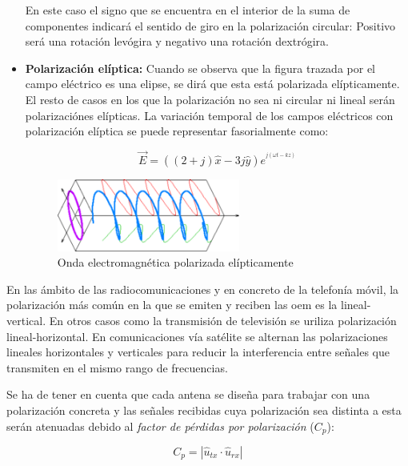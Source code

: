 \begin{itemize}
En este caso el signo que se encuentra en el interior de la suma de componentes indicará el sentido de giro en la polarización circular: Positivo será una rotación levógira y negativo una rotación dextrógira.

\item\textbf{Polarización elíptica: }Cuando se observa que la figura trazada por el campo eléctrico es una elipse, se dirá que esta está polarizada elípticamente. El resto de casos en los que la polarización no sea ni circular ni lineal serán polarizaciónes elípticas. La variación temporal de los campos eléctricos con polarización elíptica se puede representar fasorialmente como:

\begin{equation}
	\vec{E} = ((2+j)\hat{x}-3j\hat{y})e^{^{j(\omega t-kz)}}
	\label{eq:polelip}
\end{equation}
\begin{figure}[H]
    \centering
        \includegraphics[width=6cm]{archivos/polarizacion/eliptica}
        \caption{Onda electromagnética polarizada elípticamente}
        \label{fig:poleli}
\end{figure}

\end{itemize}

\par En las ámbito de las radiocomunicaciones y en concreto de la telefonía móvil, la polarización más común en la que se emiten y reciben las \gls{oem} es la lineal-vertical. En otros casos como la transmisión de televisión se uriliza polarización lineal-horizontal. En comunicaciones vía satélite se alternan las polarizaciones lineales horizontales y verticales para reducir la interferencia entre señales que transmiten en el mismo rango de frecuencias.
\\
\par Se ha de tener en cuenta que cada antena se diseña para trabajar con una polarización concreta y las señales recibidas cuya polarización sea distinta a esta serán atenuadas debido al \textit{factor de pérdidas por polarización} ($C_{p}$):

\begin{equation}
	C_{p}=\left | \hat{u}_{tx}\cdot \hat{u}_{rx} \right |
	\label{eq:polarizationlossfactor}
\end{equation}

